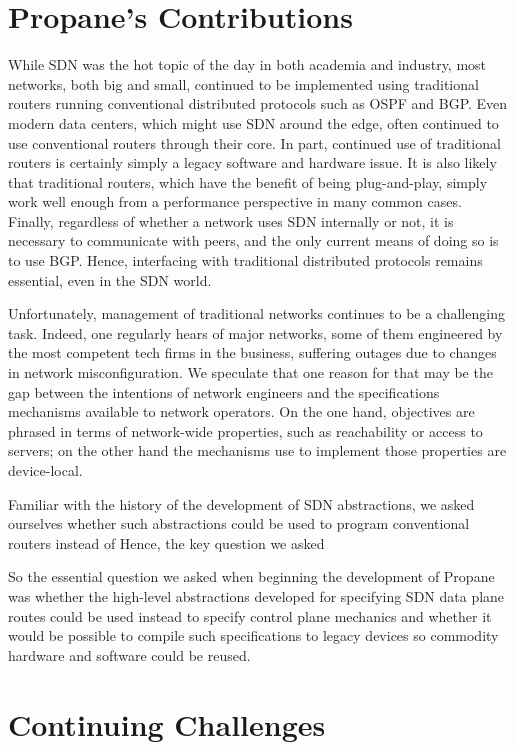 \documentclass[10pt]{sigalternate052015}
\begin{document}
\section{Propane's Contributions}

While SDN was the hot topic of the day in both academia and industry,
most networks, both big and small, continued to be implemented using
traditional routers running conventional distributed protocols such as
OSPF and BGP.  Even modern data centers, which might use SDN around
the edge, often continued to use conventional routers through their
core.  In part, continued use of traditional routers is certainly
simply a legacy software and hardware issue.  It is also likely that
traditional routers, which have the benefit of being plug-and-play,
simply work well enough from a performance perspective in many common
cases.  Finally, regardless of whether a network uses SDN internally
or not, it is necessary to communicate with peers, and the only
current means of doing so is to use BGP.  Hence, interfacing with
traditional distributed protocols remains essential, even in the SDN world.

Unfortunately, management of traditional networks continues to be a
challenging task.  Indeed, one regularly hears of major networks, some
of them engineered by the most competent tech firms in the business,
suffering outages due to changes in network misconfiguration.  We
speculate that one reason for that may be the gap between the
intentions of network engineers and the specifications mechanisms
available to network operators.  On the one hand, objectives are
phrased in terms of network-wide properties, such as reachability or
access to servers; on the other hand the mechanisms use to implement
those properties are device-local.

Familiar with the history of the development of SDN abstractions, we
asked ourselves whether such abstractions could be used to program
conventional routers instead of Hence, the key question we asked 

So the essential question we asked when beginning the
development of Propane was whether the high-level abstractions
developed for specifying SDN data plane routes could be used instead to
specify control plane mechanics and whether it would be possible to
compile such specifications to legacy devices so commodity hardware
and software could be reused.

\section{Continuing Challenges}
\end{document}
